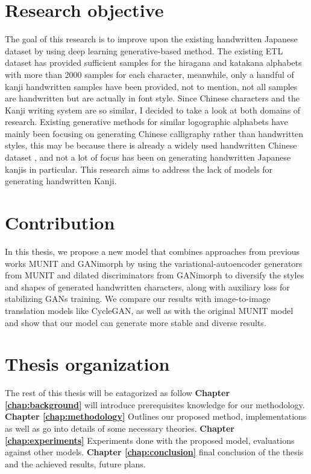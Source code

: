 \documentclass[12pt]{report}
\begin{document}
\section{Research objective}
The goal of this research is to improve upon the existing handwritten Japanese dataset by
using deep learning generative-based method.
The existing ETL dataset has provided sufficient samples for the hiragana and
katakana alphabets with more than 2000 samples for each character, meanwhile,
only a handful of kanji handwritten samples have been provided, not to mention, not
all samples are handwritten but are actually in font style.
Since Chinese characters and the Kanji writing system are so similar, I decided to
take a look at both domains of research. Existing generative methods for similar
logographic alphabets have mainly been focusing on generating Chinese calligraphy
rather than handwritten styles, this may be because there is already a
widely used handwritten Chinese dataset \cite{casia}, and not a lot of focus has been on
generating handwritten Japanese kanjis in particular. This
research aims to address the lack of models for generating handwritten Kanji.

\section{Contribution}
In this thesis, we propose a new model that combines approaches from previous works MUNIT\cite{munit} and GANimorph\cite{ganimorph} by using the variational-autoencoder generators from MUNIT and dilated discriminators from GANimorph to diversify the styles and shapes of generated handwritten characters, along with auxiliary loss for stabilizing GANs training. We compare our results with image-to-image translation models like CycleGAN\cite{cycle-gan}, as well as with the original MUNIT\cite{munit} model and show that our model can generate more stable and diverse results.

\section{Thesis organization}
The rest of this thesis will be catagorized as follow \textbf{Chapter \ref{chap:background}} will introduce prerequisites knowledge for our methodology. \textbf{Chapter \ref{chap:methodology}} Outlines our proposed method, implementations as well as go into details of some necessary theories. \textbf{Chapter \ref{chap:experiments}} Experiments done with the proposed model, evaluations against other models. \textbf{Chapter \ref{chap:conclusion}} final conclusion of the thesis and the achieved results, future plans.
\end{document}
